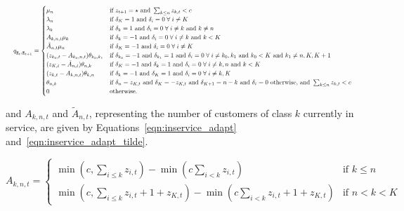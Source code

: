 \documentclass{article}
\begin{document}
\begin{equation}\label{eqn:transitions_sojourn}
\resizebox{\textwidth}{!}{%
$q_{\underline{\mathbf{z}}_t, \underline{\mathbf{z}}_{t+1}} = 
\begin{cases}
\mu_n & \text{if } z_{t+1} = \star \text{ and } \sum_{k \leq n} z_{k, t} < c \\
\lambda_n & \text{if } \delta_K = 1 \text{ and } \delta_i = 0 \; \forall \; i \neq K \\
\lambda_k & \text{if } \delta_k = 1 \text{ and } \delta_i = 0 \; \forall \; i \neq k \text{ and } k \neq n\\
A_{k,n,t} \mu_k & \text{if } \delta_k = -1 \text{ and } \delta_i = 0 \; \forall \; i \neq k \text{ and } k < K\\
\tilde{A}_{n,t} \mu_n & \text{if } \delta_K = -1 \text{ and } \delta_i = 0 \; \forall \; i \neq K\\
(z_{k_0,t} - A_{k_0,n,t}) \theta_{k_0,k_1} & \text{if } \delta_{k_0} = -1 \text{ and } \delta_{k_1} = 1 \text{ and } \delta_i = 0 \; \forall \; i \neq k_0, k_1 \text{ and } k_0 < K \text{ and } k_1 \neq n, K, K+1 \\
(z_{K,t} - \tilde{A}_{n,t}) \theta_{n,k} & \text{if } \delta_K = -1 \text{ and } \delta_{k} = 1 \text{ and } \delta_i = 0 \; \forall \; i \neq k, n \text{ and } k < K \\
(z_{k,t} - A_{k,n,t}) \theta_{k,n} & \text{if } \delta_k = -1 \text{ and } \delta_K = 1 \text{ and } \delta_i = 0 \; \forall \; i \neq k, K \\
\theta_{n, k} & \text{if } \delta_n = z_{K,t} \text{ and } \delta_K = -z_{K,t} \text{ and } \delta_{K+1} = n - k \text{ and } \delta_i = 0 \text{ otherwise, and } \sum_{k \leq n} z_{k, t} < c \\
0 & \text{otherwise.}
\end{cases}$%
}
\end{equation}

and $A_{k,n,t}$ and $\tilde{A}_{n, t}$, representing the number of customers of
class $k$ currently in service, are given by Equations~\ref{eqn:inservice_adapt}
and~\ref{eqn:inservice_adapt_tilde}.

\begin{equation}\label{eqn:inservice_adapt}
A_{k,n,t} =
\begin{cases}
\min\left(c, \sum_{i \leq k} z_{i,t}\right) - \min\left(c \sum_{i < k} z_{i,t}\right) & \text{if } k \leq n \\
\min\left(c, \sum_{i \leq k} z_{i,t} + 1 + z_{K,t}\right) - \min\left(c \sum_{i < k} z_{i,t} + 1 + z_{K,t}\right) & \text{if } n < k < K
\end{cases}
\end{equation}
\end{document}
